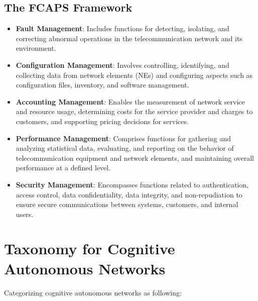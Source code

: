 \subsection{The FCAPS Framework}
\begin{itemize}
	\item \textbf{Fault Management}: Includes functions for detecting, isolating, and correcting abnormal operations in the telecommunication network and its environment.
	\item \textbf{Configuration Management}: Involves controlling, identifying, and collecting data from network elements (NEs) and configuring aspects such as configuration files, inventory, and software management.
	\item \textbf{Accounting Management}: Enables the measurement of network service and resource usage, determining costs for the service provider and charges to customers, and supporting pricing decisions for services.
	\item \textbf{Performance Management}: Comprises functions for gathering and analyzing statistical data, evaluating, and reporting on the behavior of telecommunication equipment and network elements, and maintaining overall performance at a defined level.
	\item \textbf{Security Management}: Encompasses functions related to authentication, access control, data confidentiality, data integrity, and non-repudiation to ensure secure communications between systems, customers, and internal users.
\end{itemize}
\section{Taxonomy for Cognitive Autonomous Networks}
Categorizing cognitive autonomous networks as following:
